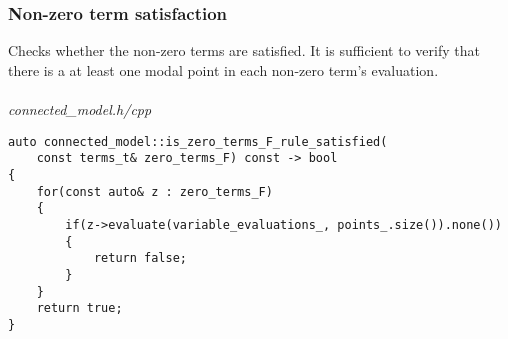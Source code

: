 \documentclass{article}
\begin{document}
	\newpage
	\subsubsection*{Non-zero term satisfaction}
	Checks whether the non-zero terms are satisfied. It is sufficient to verify that there is a at least one modal point in each non-zero term's evaluation.
\\
\\
\noindent
\textit{connected\_model.h/cpp}
\begin{lstlisting}
auto connected_model::is_zero_terms_F_rule_satisfied(
	const terms_t& zero_terms_F) const -> bool
{
    for(const auto& z : zero_terms_F)
    {
        if(z->evaluate(variable_evaluations_, points_.size()).none())
        {
            return false;
        }
    }
    return true;
}
\end{lstlisting}

	\newpage
\end{document}

